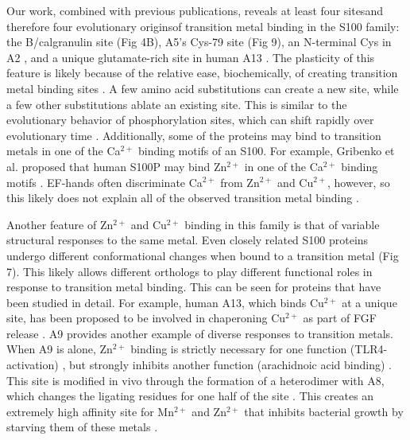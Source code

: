 Our work, combined with previous publications, reveals at least four
sites\textemdash and therefore four evolutionary origins\textemdash of
transition metal binding in the S100 family: the B/calgranulin site
(Fig 4B), A5's Cys-79 site (Fig 9), an N-terminal Cys in A2 \cite{koch_implications_2007},
and a unique glutamate-rich site in human A13 \cite{arnesano_structural_2005}.
The plasticity of this feature is likely because of the relative ease,
biochemically, of creating transition metal binding sites \cite{yamashita_where_1990,babor_prediction_2008,rubino_coordination_2012}.
A few amino acid substitutions can create a new site, while a few
other substitutions ablate an existing site. This is similar to the
evolutionary behavior of phosphorylation sites, which can shift rapidly
over evolutionary time \cite{holt_global_2009}. Additionally, some
of the proteins may bind to transition metals in one of the Ca$^{2+}$
binding motifs of an S100. For example, Gribenko et al. proposed that
human S100P may bind Zn$^{2+}$ in one of the Ca$^{2+}$ binding motifs
\cite{gribenko_oligomerization_1998}. EF-hands often discriminate
Ca$^{2+}$ from Zn$^{2+}$ and Cu$^{2+}$, however, so this likely
does not explain all of the observed transition metal binding \cite{arnesano_structural_2005,mills_metal_1985,grabarek_insights_2011,chung_ef-hand_2016}.

Another feature of Zn$^{2+}$ and Cu$^{2+}$ binding in this family
is that of variable structural responses to the same metal. Even closely
related S100 proteins undergo different conformational changes when
bound to a transition metal (Fig 7). This likely allows different
orthologs to play different functional roles in response to transition
metal binding. This can be seen for proteins that have been studied
in detail. For example, human A13, which binds Cu$^{2+}$ at a unique
site, has been proposed to be involved in chaperoning Cu$^{2+}$ as
part of FGF release \cite{sivaraja_copper_2006}. A9 provides another
example of diverse responses to transition metals. When A9 is alone,
Zn$^{2+}$ binding is strictly necessary for one function (TLR4-activation)
\cite{bjork_identification_2009}, but strongly inhibits another function
(arachidnoic acid binding) \cite{kerkhoff_zinc_1999}. This site is
modified in vivo through the formation of a heterodimer with A8, which
changes the ligating residues for one half of the site \cite{damo_molecular_2013,gagnon_manganese_2015}.
This creates an extremely high affinity site for Mn$^{2+}$ and Zn$^{2+}$
that inhibits bacterial growth by starving them of these metals \cite{damo_molecular_2013}.


